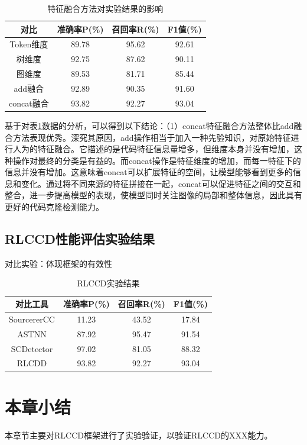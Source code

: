 \begin{table}[htp]
  \centering
  \caption{特征融合方法对实验结果的影响}
  \label{tab:concat}
  \begin{tabular*}{0.9\textwidth}{@{\extracolsep{\fill}}cccc}
  \toprule
    对比			& 准确率P(\%) & 召回率R(\%) & F1值(\%)  \\ 
  \midrule
    Token维度			  & 89.78	  & 95.62	  & 92.61	   \\  
    树维度		      & 92.75	  & 87.62	  & 90.11   \\ 
    图维度			    & 89.53		& 81.71		& 85.44   \\
    add融合			   & 92.89		& 90.35		& 91.60   \\
    concat融合     	  & 93.82		& 92.27		& 93.04  \\
  \bottomrule
  \end{tabular*}
\end{table}


基于对表\ref{tab:concat}数据的分析，可以得到以下结论：（1）concat特征融合方法整体比add融合方法表现优秀。深究其原因，add操作相当于加入一种先验知识，对原始特征进行人为的特征融合。它描述的是代码特征信息量增多，但维度本身并没有增加，这种操作对最终的分类是有益的。而concat操作是特征维度的增加，而每一特征下的信息并没有增加。这意味着concat可以扩展特征的空间，让模型能够看到更多的信息和变化。通过将不同来源的特征拼接在一起，concat可以促进特征之间的交互和整合，进一步提高模型的表现，使模型同时关注图像的局部和整体信息，因此具有更好的代码克隆检测能力。


\subsection{RLCCD性能评估实验结果}

对比实验：体现框架的有效性


\begin{table}[htp]
  \centering
  \caption{RLCCD实验结果}
  \label{tab:RLCCD}
  \begin{tabular*}{0.9\textwidth}{@{\extracolsep{\fill}}cccc}
  \toprule
    对比工具		& 准确率P(\%) & 召回率R(\%) & F1值(\%)  \\ 
  \midrule
    SourcererCC		& 11.23	  & 43.52		& 17.84 \\
    ASTNN			    & 87.92		& 95.47		& 91.54 \\
    SCDetector		& 97.02	  & 81.05		& 88.32 \\
    RLCDD			    & 93.82		& 92.27		& 93.04  \\
  \bottomrule
  \end{tabular*}
\end{table}

\section{本章小结}
本章节主要对RLCCD框架进行了实验验证，以验证RLCCD的XXX能力。



